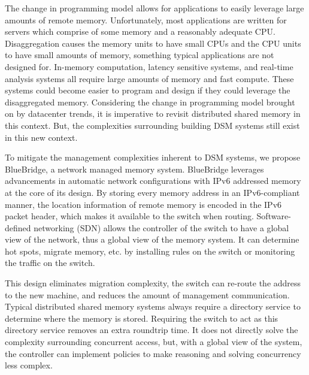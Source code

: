 The change in programming model allows for applications to easily leverage large amounts of remote memory. Unfortunately, most applications are written for servers which comprise of some memory and a reasonably adequate CPU. Disaggregation causes the memory units to have small CPUs and the CPU units to have small amounts of memory, something typical applications are not designed for. In-memory computation, latency sensitive systems, and real-time analysis systems all require large amounts of memory and fast compute. These systems could become easier to program and design if they could leverage the disaggregated memory.  
Considering the change in programming model brought on by datacenter trends, it is imperative to revisit distributed shared memory in this context. But, the complexities surrounding building DSM systems still exist in this new context.

To mitigate the management complexities inherent to DSM systems, we propose BlueBridge, a network managed memory system. BlueBridge leverages advancements in automatic network configurations with IPv6 addressed memory at the core of its design. By storing every memory address in an IPv6-compliant manner, the location information of remote memory is encoded in the IPv6 packet header, which makes it available to the switch when routing. Software-defined networking (SDN) allows the controller of the switch to have a global view of the network, thus a global view of the memory system. It can determine hot spots, migrate memory, etc. by installing rules on the switch or monitoring the traffic on the switch.

This design eliminates migration complexity, the switch can re-route the address to the new machine, and reduces the amount of management communication. Typical distributed shared memory systems always require a directory service to determine where the memory is stored. Requiring the switch to act as this directory service removes an extra roundtrip time. It does not directly solve the complexity surrounding concurrent access, but, with a global view of the system, the controller can implement policies to make reasoning and solving concurrency less complex.

